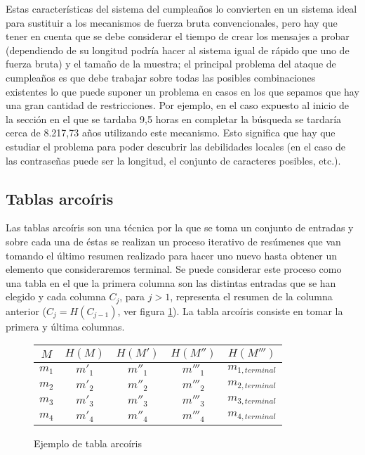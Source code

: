 Estas características del sistema del cumpleaños lo convierten en un sistema ideal para sustituir a los mecanismos de fuerza bruta convencionales, pero hay que tener en cuenta que se debe considerar el tiempo de crear los mensajes a probar (dependiendo de su longitud podría hacer al sistema igual de rápido que uno de fuerza bruta) y el tamaño de la muestra; el principal problema del ataque de cumpleaños es que debe trabajar sobre todas las posibles combinaciones existentes lo que puede suponer un problema en casos en los que sepamos que hay una gran cantidad de restricciones. Por ejemplo, en el caso expuesto al inicio de la sección en el que se tardaba 9,5 horas en completar la búsqueda se tardaría cerca de 8.217,73 años utilizando este mecanismo. Esto significa que hay que estudiar el problema para poder descubrir las debilidades locales (en el caso de las contraseñas puede ser la longitud, el conjunto de caracteres posibles, etc.).

\subsection{Tablas arcoíris}

Las tablas arcoíris son una técnica por la que se toma un conjunto de entradas y sobre cada una de éstas se realizan un proceso iterativo de resúmenes que van tomando el último resumen realizado para hacer uno nuevo hasta obtener un elemento que consideraremos terminal. Se puede considerar este proceso como una tabla en el que la primera columna son las distintas entradas que se han elegido y cada columna $C_j$, para $j>1$, representa el resumen de la columna anterior ($C_j = H(C_{j-1})$, ver figura \ref{fig:arcoiris}). La tabla arcoíris consiste en tomar la primera y última columnas.

\begin{figure}
	\centering
	\begin{tabular}{ccccc}
		\hline
		$M$   & $H(M)$ & $H(M')$ & $H(M'')$ & $H(M''')$\\
		\hline
		$m_1$ & $m'_1$ & $m''_1$ & $m'''_1$ & $m_{1,terminal}$\\
		\hline
		$m_2$ & $m'_2$ & $m''_2$ & $m'''_2$ & $m_{2,terminal}$\\
		\hline
		$m_3$ & $m'_3$ & $m''_3$ & $m'''_3$ & $m_{3,terminal}$\\
		\hline
		$m_4$ & $m'_4$ & $m''_4$ & $m'''_4$ & $m_{4,terminal}$\\
		\hline
	\end{tabular}
	\caption{Ejemplo de tabla arcoíris}\label{fig:arcoiris}
\end{figure}


